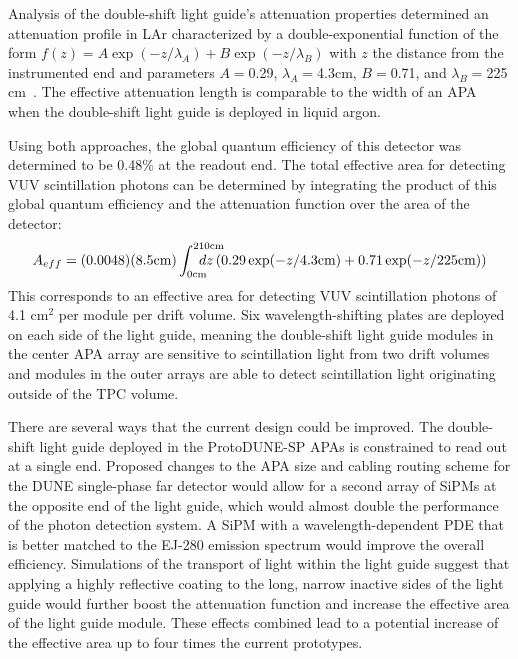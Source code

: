 
Analysis of the double-shift light guide's attenuation properties determined an attenuation profile in LAr characterized by a double-exponential function of the form $f(z) = A \exp(-z/\lambda_{A}) + B \exp(-z/\lambda_B)$ with $z$ the distance from the instrumented end and parameters $A = $0.29, $\lambda_A = $4.3cm, $B = $0.71, and $\lambda_B = $225 cm~\cite{bib:DoubleShiftLG-NIM-171113}. The effective attenuation length is comparable to the width of an APA when the double-shift light guide is deployed in liquid argon.

Using both approaches, the global quantum efficiency of this detector was determined to be 0.48\% at the readout end. The total effective area for detecting VUV scintillation photons can be determined by integrating the product of this global quantum efficiency and the attenuation function over the area of the detector:
\begin{equation*}
  A_{eff} = (0.0048) (8.5\text{cm}) \int_{0\text{cm}}^{210\text{cm}} \hspace{-2em}dz \left( 0.29 \exp(-z/4.3\text{cm}) + 0.71 \exp(-z/225\text{cm}) \right)
\end{equation*}
This corresponds to an effective area for detecting VUV scintillation photons of 4.1 cm$^{2}$ per module per drift volume. Six wavelength-shifting plates are deployed on each side of the light guide, meaning the double-shift light guide modules in the center APA array are sensitive to scintillation light from two drift volumes and modules in the outer arrays are able to detect scintillation light originating outside of the TPC volume.




There are several ways that the current design could be improved. The double-shift light guide deployed in the ProtoDUNE-SP APAs is constrained to read out at a single end. Proposed changes to the APA size and cabling routing scheme for the DUNE single-phase far detector would allow for a second array of SiPMs at the opposite end of the light guide, which would almost double the performance of the photon detection system.
A SiPM with a wavelength-dependent PDE that is better matched to the EJ-280 emission spectrum would improve the overall efficiency. Simulations of the transport of light within the light guide suggest that applying a highly reflective coating to the long, narrow inactive sides of the light guide would further boost the attenuation function and increase the effective area of the light guide module. These effects combined lead to a potential increase of the effective area up to four times the current prototypes.

